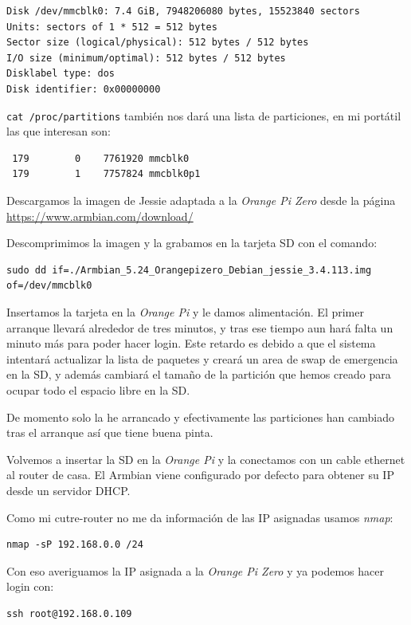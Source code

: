 \documentclass[12pt,spanish,]{scrartcl}
\begin{document}
\begin{verbatim}
Disk /dev/mmcblk0: 7.4 GiB, 7948206080 bytes, 15523840 sectors
Units: sectors of 1 * 512 = 512 bytes
Sector size (logical/physical): 512 bytes / 512 bytes
I/O size (minimum/optimal): 512 bytes / 512 bytes
Disklabel type: dos
Disk identifier: 0x00000000
\end{verbatim}

\texttt{cat\ /proc/partitions} también nos dará una lista de
particiones, en mi portátil las que interesan son:

\begin{verbatim}
 179        0    7761920 mmcblk0
 179        1    7757824 mmcblk0p1
\end{verbatim}

Descargamos la imagen de Jessie adaptada a la \emph{Orange Pi Zero}
desde la página \url{https://www.armbian.com/download/}

Descomprimimos la imagen y la grabamos en la tarjeta SD con el comando:

\begin{verbatim}
sudo dd if=./Armbian_5.24_Orangepizero_Debian_jessie_3.4.113.img of=/dev/mmcblk0
\end{verbatim}

Insertamos la tarjeta en la \emph{Orange Pi} y le damos alimentación. El
primer arranque llevará alrededor de tres minutos, y tras ese tiempo aun
hará falta un minuto más para poder hacer login. Este retardo es debido
a que el sistema intentará actualizar la lista de paquetes y creará un
area de swap de emergencia en la SD, y además cambiará el tamaño de la
partición que hemos creado para ocupar todo el espacio libre en la SD.

De momento solo la he arrancado y efectivamente las particiones han
cambiado tras el arranque así que tiene buena pinta.

Volvemos a insertar la SD en la \emph{Orange Pi} y la conectamos con un
cable ethernet al router de casa. El Armbian viene configurado por
defecto para obtener su IP desde un servidor DHCP.

Como mi cutre-router no me da información de las IP asignadas usamos
\emph{nmap}:

\begin{verbatim}
nmap -sP 192.168.0.0 /24
\end{verbatim}

Con eso averiguamos la IP asignada a la \emph{Orange Pi Zero} y ya
podemos hacer login con:

\begin{verbatim}
ssh root@192.168.0.109
\end{verbatim}
\end{document}
